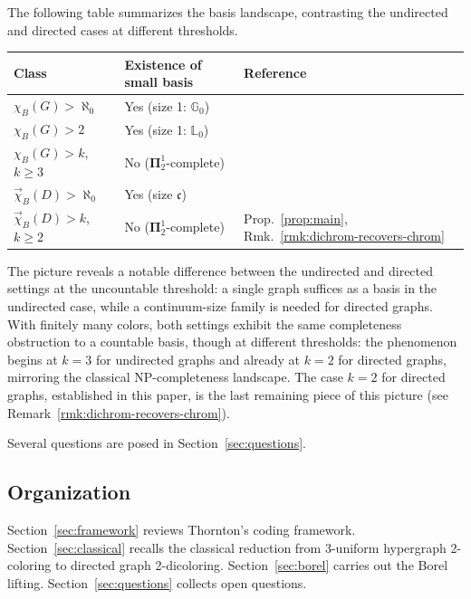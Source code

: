 \documentclass[12pt]{article}
\begin{document}
The following table summarizes the basis landscape, contrasting the undirected and directed cases at different thresholds.

\medskip
\begin{center}
\begin{tabular}{lll}
	\hline
	\textbf{Class} & \textbf{Existence of small basis} & \textbf{Reference} \\
	\hline
	$\chi_B(G) > \aleph_0$ & Yes (size 1: $\mathbb{G}_0$) & \cite{kechris1999borel} \\
	$\chi_B(G) > 2$ & Yes (size 1: $\mathbb{L}_0$) & \cite{L0paper} \\
	$\chi_B(G) > k$, $k\geq 3$ & No ($\mathbf\Pi^1_2$-complete) & \cite{Todorcevic_2021_ComplexProbBorel} \\
	\hline
	$\vec\chi_B(D) > \aleph_0$ & Yes (size $\mathfrak{c}$) & \cite{RaghavanXiao2024} \\
	$\vec\chi_B(D) > k$, $k\geq 2$ & No ($\mathbf\Pi^1_2$-complete) & Prop.~\ref{prop:main}, Rmk.~\ref{rmk:dichrom-recovers-chrom} \\
	\hline
\end{tabular}
\end{center}
\medskip

\noindent
The picture reveals a notable difference between the undirected and directed settings at the uncountable threshold: a single graph suffices as a basis in the undirected case, while a continuum-size family is needed for directed graphs.
With finitely many colors, both settings exhibit the same completeness obstruction to a countable basis, though at different thresholds: the phenomenon begins at $k=3$ for undirected graphs and already at $k=2$ for directed graphs, mirroring the classical NP-completeness landscape.
The case $k=2$ for directed graphs, established in this paper, is the last remaining piece of this picture (see Remark~\ref{rmk:dichrom-recovers-chrom}).

Several questions are posed in Section~\ref{sec:questions}.

\subsection{Organization}
Section~\ref{sec:framework} reviews Thornton's coding framework.
Section~\ref{sec:classical} recalls the classical reduction from 3-uniform hypergraph 2-coloring to directed graph 2-dicoloring.
Section~\ref{sec:borel} carries out the Borel lifting.
Section~\ref{sec:questions} collects open questions.
\end{document}
